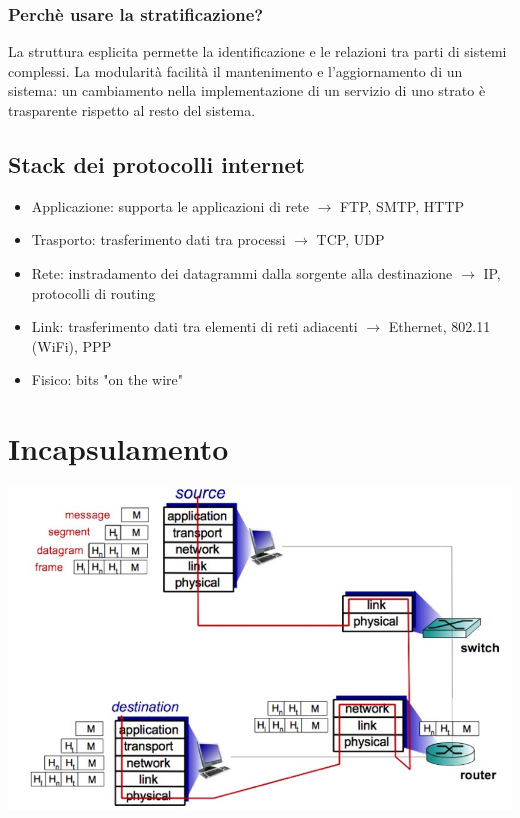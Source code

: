 \subsubsection{Perchè usare la stratificazione?}
La struttura esplicita permette la identificazione e le relazioni tra parti di sistemi complessi. La modularità facilità il mantenimento e l'aggiornamento di un sistema: un cambiamento nella implementazione di un servizio di uno strato è trasparente rispetto al resto del sistema.

\subsection{Stack dei protocolli internet}
\begin{itemize}
    \item Applicazione: supporta le applicazioni di rete $\rightarrow$ FTP, SMTP, HTTP
    \item Trasporto: trasferimento dati tra processi $\rightarrow$ TCP, UDP
    \item Rete: instradamento dei datagrammi dalla sorgente alla destinazione $\rightarrow$ IP, protocolli di routing
    \item Link: trasferimento dati tra elementi di reti adiacenti $\rightarrow$ Ethernet, 802.11 (WiFi), PPP
    \item Fisico: bits "on the wire"
\end{itemize}

\section{Incapsulamento}
\begin{center}
\includegraphics[scale=0.4]{Images/TecnologieWeb/1/encapsulation.jpg}
\end{center}


